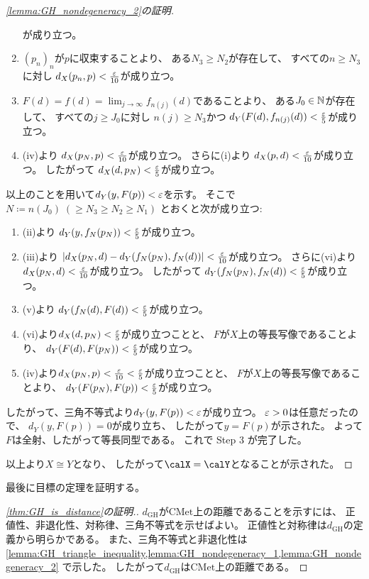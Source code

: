 \documentclass[report, notitlepage]{jlreq}
\newcommand{\CMet}{\mathrm{CMet}}
\newcommand{\GH}{\mathrm{GH}}
\begin{document}
\begin{proof}[\cref{lemma:GH_nondegeneracy_2}の証明]
\begin{enumerate}[label=(\roman*)]
            が成り立つ。
        \item $(p_n)_n$が$p$に収束することより、
            ある$N_3 \ge N_2$が存在して、
            すべての$n \ge N_3$に対し
            $d_X(p_n, p) < \frac{\varepsilon}{10}$が成り立つ。
        \item $F(d) = f(d) = \lim_{j \to \infty} f_{n(j)}(d)$であることより、
            ある$J_0 \in \mathbb{N}$が存在して、
            すべての$j \ge J_0$に対し
            $n(j) \ge N_3$かつ
            $d_Y(F(d), f_{n(j)}(d)) < \frac{\varepsilon}{5}$が成り立つ。
        \item (iv)より
            $d_X(p_N, p) < \frac{\varepsilon}{10}$が成り立つ。
            さらに(i)より
            $d_X(p, d) < \frac{\varepsilon}{10}$が成り立つ。
            したがって
            $d_X(d, p_N) < \frac{\varepsilon}{5}$が成り立つ。
    \end{enumerate}
    以上のことを用いて$d_Y(y, F(p)) < \varepsilon$を示す。
    そこで$N \coloneqq n(J_0) \; (\ge N_3 \ge N_2 \ge N_1)$
    とおくと次が成り立つ:
    \begin{enumerate}
        \item (ii)より
            $d_Y(y, f_N(p_N)) < \frac{\varepsilon}{5}$が成り立つ。
        \item (iii)より
            $|d_X(p_N, d) - d_Y(f_N(p_N), f_N(d))| < \frac{\varepsilon}{10}$が成り立つ。
            さらに(vi)より
            $d_X(p_N, d) < \frac{\varepsilon}{10}$が成り立つ。
            したがって
            $d_Y(f_N(p_N), f_N(d)) < \frac{\varepsilon}{5}$が成り立つ。
        \item (v)より
            $d_Y(f_N(d), F(d)) < \frac{\varepsilon}{5}$が成り立つ。
        \item (vi)より$d_X(d, p_N) < \frac{\varepsilon}{5}$が成り立つことと、
            $F$が$X$上の等長写像であることより、
            $d_Y(F(d), F(p_N)) < \frac{\varepsilon}{5}$が成り立つ。
        \item (iv)より$d_X(p_N, p) < \frac{\varepsilon}{10} < \frac{\varepsilon}{5}$が成り立つことと、
            $F$が$X$上の等長写像であることより、
            $d_Y(F(p_N), F(p)) < \frac{\varepsilon}{5}$が成り立つ。
    \end{enumerate}
    したがって、三角不等式より$d_Y(y, F(p)) < \varepsilon$が成り立つ。
    $\varepsilon > 0$は任意だったので、
    $d_Y(y, F(p)) = 0$が成り立ち、
    したがって$y = F(p)$が示された。
    よって$F$は全射、したがって等長同型である。
    これで Step 3 が完了した。

    以上より$X \cong Y$となり、
    したがって$\calX = \calY$となることが示された。
\end{proof}

最後に目標の定理を証明する。

\begin{proof}[\cref{thm:GH_is_distance}の証明.]
    $d_\GH$が$\CMet$上の距離であることを示すには、
    正値性、非退化性、対称律、三角不等式を示せばよい。
    正値性と対称律は$d_\GH$の定義から明らかである。
    また、三角不等式と非退化性は
    \cref{lemma:GH_triangle_inequality,lemma:GH_nondegeneracy_1,lemma:GH_nondegeneracy_2}
    で示した。
    したがって$d_\GH$は$\CMet$上の距離である。
\end{proof}
\end{document}
